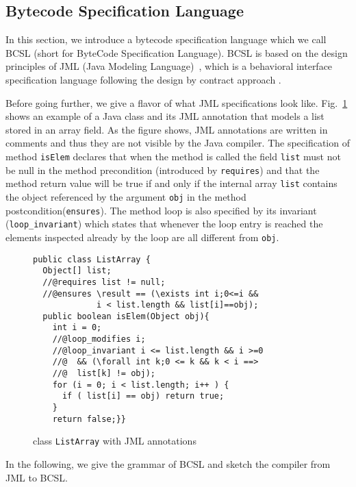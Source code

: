 
\subsection{Bytecode Specification Language}\label{bcSpecLg}

In this section, we introduce a bytecode specification language which we call BCSL (short for ByteCode Specification Language).
 BCSL is based on the design principles of JML (Java Modeling Language)~\cite{JMLRefMan}, which is a behavioral interface specification 
language following the design by contract approach \cite{M97oos}.


Before going further, we give a flavor of what JML specifications look like. Fig.~\ref{replaceSrc} shows an example of a Java class and its 
JML annotation that models a list stored in an array field. 
As the figure shows, JML annotations are written in comments and thus they are not visible by the Java compiler.
The specification of method \verb!isElem! declares
 that when the method is called the field \verb!list! must not be null in the method precondition (introduced by \verb!requires!) 
and that the method return value will be true if and only if the internal array 
\verb!list! contains the object referenced by the argument \verb!obj! in the method postcondition(\verb!ensures!). The method loop is also specified by
its invariant (\verb!loop_invariant!) which states that whenever the loop entry is reached the elements inspected already by the loop are all different from \verb!obj!.


\begin{figure}[t]

\begin{verbatim}
public class ListArray {
  Object[] list;
  //@requires list != null;
  //@ensures \result == (\exists int i;0<=i && 
             i < list.length && list[i]==obj); 
  public boolean isElem(Object obj){
    int i = 0;
    //@loop_modifies i;
    //@loop_invariant i <= list.length && i >=0 
    //@  && (\forall int k;0 <= k && k < i ==> 
    //@  list[k] != obj); 
    for (i = 0; i < list.length; i++ ) {
      if ( list[i] == obj) return true; 
    }
    return false;}}
\end{verbatim}
\caption{\sc class \texttt{ListArray} with JML annotations} 
\label{replaceSrc}
\end{figure}


In the following, we give the grammar of BCSL and sketch the compiler from JML to BCSL. 


